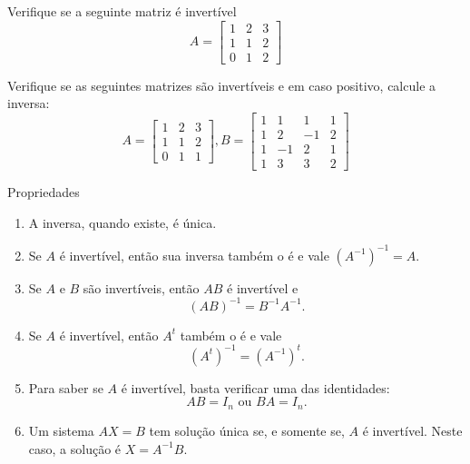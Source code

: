 \begin{frame}[label=inversao]


\begin{exer}
Verifique se a seguinte matriz é invertível
\[
A=\begin{bmatrix}
1 & 2 & 3\\ 1 & 1 & 2 \\ 0& 1 & 2
\end{bmatrix}
\] 
\end{exer}

\end{frame}


\begin{frame}[label=inversao]


\begin{casa}
Verifique se as seguintes matrizes são invertíveis e em caso positivo, calcule a inversa:
\[
A=\begin{bmatrix}
1 & 2 & 3\\ 1 & 1 & 2 \\ 0 & 1 & 1  
\end{bmatrix},
B=\begin{bmatrix}
1 & 1 & 1 & 1\\ 1 & 2 & -1 & 2 \\ 1 & -1 & 2 &  1\\ 1& 3 & 3& 2 
\end{bmatrix}
\] 
\end{casa}

\end{frame}

\begin{frame}[label=inversao]
\begin{block}{Propriedades}
\begin{enumerate}
\item A inversa, quando existe, é única.

\item Se $A$ é invertível, então sua inversa também o é e vale $(A^{-1})^{-1}=A$.

\item Se $A$ e $B$ são invertíveis, então $AB$ é invertível e
\[(AB)^{-1}=B^{-1}A^{-1}. \]

\item Se $A$ é invertível, então $A^t$ também o é e vale
\[(A^t)^{-1}=(A^{-1})^t.\]

\item Para saber se $A$ é invertível, basta verificar uma das identidades:
\[AB=I_n \text{ ou } BA=I_n.\]

\item Um sistema $AX=B$ tem solução única se, e somente se, $A$ é invertível. Neste caso, a solução é $X=A^{-1}B$.
\end{enumerate}

\end{block}

\end{frame}

